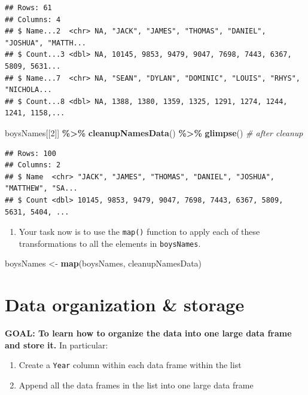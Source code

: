 \documentclass[
]{book}
\newenvironment{Shaded}{\begin{snugshade}}{\end{snugshade}}
\newcommand{\CommentTok}[1]{\textcolor[rgb]{0.56,0.35,0.01}{\textit{#1}}}
\newcommand{\DecValTok}[1]{\textcolor[rgb]{0.00,0.00,0.81}{#1}}
\newcommand{\KeywordTok}[1]{\textcolor[rgb]{0.13,0.29,0.53}{\textbf{#1}}}
\newcommand{\NormalTok}[1]{#1}
\newcommand{\OperatorTok}[1]{\textcolor[rgb]{0.81,0.36,0.00}{\textbf{#1}}}
\newcommand{\StringTok}[1]{\textcolor[rgb]{0.31,0.60,0.02}{#1}}
\providecommand{\tightlist}{%
  \setlength{\itemsep}{0pt}\setlength{\parskip}{0pt}}
\begin{document}
\begin{alert}
\begin{verbatim}
## Rows: 61
## Columns: 4
## $ Name...2  <chr> NA, "JACK", "JAMES", "THOMAS", "DANIEL", "JOSHUA", "MATTH...
## $ Count...3 <dbl> NA, 10145, 9853, 9479, 9047, 7698, 7443, 6367, 5809, 5631...
## $ Name...7  <chr> NA, "SEAN", "DYLAN", "DOMINIC", "LOUIS", "RHYS", "NICHOLA...
## $ Count...8 <dbl> NA, 1388, 1380, 1359, 1325, 1291, 1274, 1244, 1241, 1158,...
\end{verbatim}

\begin{Shaded}
\begin{Highlighting}[]
\NormalTok{boysNames[[}\DecValTok{2}\NormalTok{]] }\OperatorTok{\%\textgreater{}\%}\StringTok{ }\KeywordTok{cleanupNamesData}\NormalTok{() }\OperatorTok{\%\textgreater{}\%}\StringTok{ }\KeywordTok{glimpse}\NormalTok{() }\CommentTok{\# after cleanup}
\end{Highlighting}
\end{Shaded}

\begin{verbatim}
## Rows: 100
## Columns: 2
## $ Name  <chr> "JACK", "JAMES", "THOMAS", "DANIEL", "JOSHUA", "MATTHEW", "SA...
## $ Count <dbl> 10145, 9853, 9479, 9047, 7698, 7443, 6367, 5809, 5631, 5404, ...
\end{verbatim}

\begin{enumerate}
\def\labelenumi{\arabic{enumi}.}
\setcounter{enumi}{1}
\tightlist
\item
  Your task now is to use the \texttt{map()} function to apply each of these transformations to all the elements in \texttt{boysNames}.
\end{enumerate}

\begin{Shaded}
\begin{Highlighting}[]
\NormalTok{boysNames \textless{}{-}}\StringTok{ }\KeywordTok{map}\NormalTok{(boysNames, cleanupNamesData)}
\end{Highlighting}
\end{Shaded}

\end{alert}

\hypertarget{data-organization-storage}{%
\section{Data organization \& storage}\label{data-organization-storage}}

\begin{alert}

\textbf{GOAL: To learn how to organize the data into one large data frame and store it.} In particular:

\begin{enumerate}
\def\labelenumi{\arabic{enumi}.}
\tightlist
\item
  Create a \texttt{Year} column within each data frame within the list
\item
  Append all the data frames in the list into one large data frame
\end{enumerate}

\end{alert}
\end{document}
